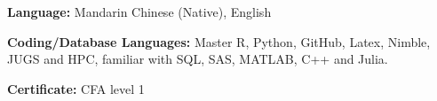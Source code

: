 

\begin{cvparagraph}

\cventry
    {} %
    {} %
    {} %
    {} %
    {\begin{cvitems}
        \item \textbf{Language:} Mandarin Chinese (Native), English
        \item \textbf{Coding/Database Languages:} Master R, Python, GitHub, Latex, Nimble, JUGS and HPC, familiar with SQL, SAS, MATLAB, C++ and Julia.
        \item \textbf{Certificate:} CFA level 1
    \end{cvitems}}
\end{cvparagraph}
